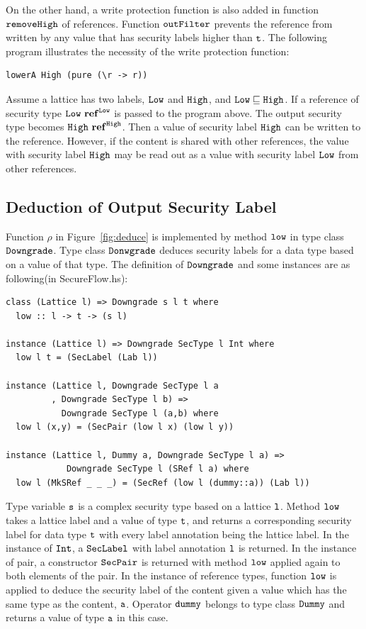 \documentclass{report}
\newcommand{\co}[1]{$\cod{#1}$}
\begin{document}
On the other hand, a write protection function is also added in function \co{removeHigh} of references. Function
\co{outFilter} prevents the reference from written by any value that has security labels higher than \co{t}. 
The following program illustrates the necessity of the write protection function:
\begin{Verbatim}[fontsize=\small]
lowerA High (pure (\r -> r))
\end{Verbatim}
Assume a lattice has two labels, \co{Low} and \co{High}, and $\mathtt{Low}\sqsubseteq \mathtt{High}$. If a reference 
of security type $\mathtt{Low}~\mathbf{ref}^{\mathtt{Low}}$ is passed to the program above. The output 
security type becomes $\mathtt{High}~\mathbf{ref}^{\mathtt{High}}$. Then a value of security label \co{High} can
be written to the reference. However, if the content is shared with other references, the value with 
security label \co{High} may be read out as a value with security label \co{Low} from other references.

\subsection{Deduction of Output Security Label}
\label{chap5:lowerA:old}
Function $\rho$ in Figure~\ref{fig:deduce} is implemented by method \co{low} in type class \co{Downgrade}. 
Type class \co{Donwgrade} deduces security labels for a data type based on a value of
that type.
The definition of \co{Downgrade} and some instances are as following(in SecureFlow.hs): 
\begin{Verbatim}[fontsize=\small]
class (Lattice l) => Downgrade s l t where
  low :: l -> t -> (s l)

instance (Lattice l) => Downgrade SecType l Int where
  low l t = (SecLabel (Lab l))

instance (Lattice l, Downgrade SecType l a
         , Downgrade SecType l b) =>
           Downgrade SecType l (a,b) where
  low l (x,y) = (SecPair (low l x) (low l y))

instance (Lattice l, Dummy a, Downgrade SecType l a) =>
            Downgrade SecType l (SRef l a) where
  low l (MkSRef _ _ _) = (SecRef (low l (dummy::a)) (Lab l))
\end{Verbatim}
Type variable \co{s} is a complex security type based on a lattice \co{l}.
Method \co{low} takes a lattice label and a value of type \co{t}, and returns a corresponding security label 
for data type \co{t} with every label annotation being the lattice label.
In the instance of \co{Int}, a \co{SecLabel} with label annotation \co{l} is returned. 
In the instance of pair, a constructor \co{SecPair} is returned with method \co{low} applied again to both 
elements of the pair.
In the instance of reference types, function \co{low} is applied to deduce the security label of the content 
given a value which has the same type as the content, \co{a}.
Operator \co{dummy} belongs to type class \co{Dummy} and returns a value of type \co{a} in this case. 
\end{document}
